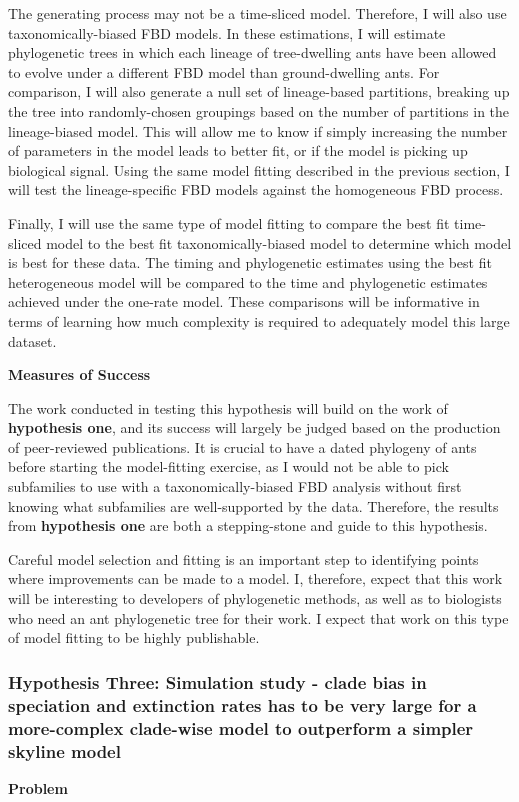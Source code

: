 \documentclass[12pt]{article}
\begin{document}
The generating process may not be a time-sliced model.
Therefore, I will also use taxonomically-biased FBD models.
In these estimations, I will estimate phylogenetic trees in which each lineage of tree-dwelling ants have been allowed to evolve under a different FBD model than ground-dwelling ants.
For comparison, I will also generate a null set of lineage-based partitions, breaking up the tree into randomly-chosen groupings based on the number of partitions in the lineage-biased model.
This will allow me to know if simply increasing the number of parameters in the model leads to better fit, or if the model is picking up biological signal.
Using the same model fitting described in the previous section, I will test the lineage-specific FBD models against the homogeneous FBD process. \par
Finally, I will use the same type of model fitting to compare the best fit time-sliced model to the best fit taxonomically-biased model to determine which model is best for these data.
The timing and phylogenetic estimates using the best fit heterogeneous model will be compared to the time and phylogenetic estimates achieved under the one-rate model.
These comparisons will be informative in terms of learning how much  complexity is required to adequately model this large dataset.

\textbf{Measures of Success} \par

The work conducted in testing this hypothesis will build on the work of \textbf{hypothesis one}, and its success will largely be judged based on the production of peer-reviewed publications.
It is crucial to have a dated phylogeny of ants before starting the model-fitting exercise, as I would not be able to pick subfamilies to use with a taxonomically-biased FBD analysis without first knowing what subfamilies are well-supported by the data. 
Therefore, the results from \textbf{hypothesis one} are both a stepping-stone and guide to this hypothesis. \par
Careful model selection and fitting is an important step to identifying points where improvements can be made to a model.
I, therefore, expect that this work will be interesting to developers of phylogenetic methods, as well as to biologists who need an ant phylogenetic tree for their work.
I expect that work on this type of model fitting to be highly publishable. \par

\subsubsection*{Hypothesis Three: Simulation study - clade bias in speciation and extinction rates has to be very large for a more-complex clade-wise model to outperform a simpler skyline model} 
\textbf{Problem}
\end{document}
